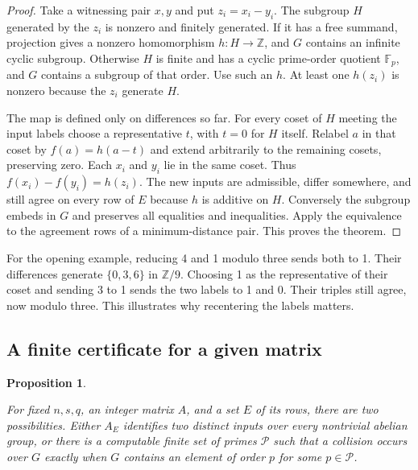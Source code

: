 \documentclass[11pt,letterpaper]{article}
\newtheorem{proposition}[theorem]{Proposition}
\numberwithin{equation}{section}
\begin{document}
\begin{proof}

Take a witnessing pair $x,y$ and put $z_i=x_i-y_i$. The subgroup $H$ generated by the $z_i$ is
nonzero and finitely generated. If it has a free summand, projection gives a nonzero
homomorphism $h:H\to\mathbb Z$, and $G$ contains an infinite cyclic subgroup. Otherwise $H$ is
finite and has a cyclic prime-order quotient $\mathbb F_p$, and $G$ contains a subgroup of
that order. Use such an $h$. At least one $h(z_i)$ is nonzero because the $z_i$ generate $H$.

The map is defined only on differences so far. For every coset of $H$ meeting the input labels
choose a representative $t$, with $t=0$ for $H$ itself. Relabel $a$ in that coset by
$f(a)=h(a-t)$ and extend arbitrarily to the remaining cosets, preserving zero. Each $x_i$ and
$y_i$ lie in the same coset. Thus $f(x_i)-f(y_i)=h(z_i)$. The new inputs are admissible,
differ somewhere, and still agree on every row of $E$ because $h$ is additive on $H$.
Conversely the subgroup embeds in $G$ and preserves all equalities and inequalities. Apply the
equivalence to the agreement rows of a minimum-distance pair. This proves the theorem.
\end{proof}

For the opening example, reducing 4 and 1 modulo three sends both to 1. Their differences
generate $\{0,3,6\}$ in $\mathbb Z/9$. Choosing 1 as the representative of their coset and
sending 3 to 1 sends the two labels to 1 and 0. Their triples still agree, now modulo three.
This illustrates why recentering the labels matters.

\subsection{A finite certificate for a given matrix}\label{sec:smith}

\begin{proposition}\label{prop:smith}

For fixed $n,s,q$, an integer matrix $A$, and a set $E$ of its rows, there are two
possibilities. Either $A_E$ identifies two distinct inputs over every nontrivial abelian
group, or there is a computable finite set of primes $\mathcal P$ such that a collision occurs
over $G$ exactly when $G$ contains an element of order $p$ for some $p\in\mathcal P$.
\end{proposition}
\end{document}
